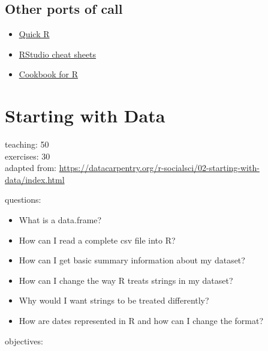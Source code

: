 \documentclass[]{book}
\providecommand{\tightlist}{%
  \setlength{\itemsep}{0pt}\setlength{\parskip}{0pt}}
\begin{document}
\section{Other ports of call}\label{other-ports-of-call}

\begin{itemize}
\tightlist
\item
  \href{http://www.statmethods.net/}{Quick R}
\item
  \href{http://www.rstudio.com/resources/cheatsheets/}{RStudio cheat
  sheets}
\item
  \href{http://www.cookbook-r.com/}{Cookbook for R}
\end{itemize}

\chapter{Starting with Data}\label{dataframes}

teaching: 50\\
exercises: 30\\
adapted from:
\url{https://datacarpentry.org/r-socialsci/02-starting-with-data/index.html}

questions:

\begin{itemize}
\tightlist
\item
  What is a data.frame?\\
\item
  How can I read a complete csv file into R?\\
\item
  How can I get basic summary information about my dataset?\\
\item
  How can I change the way R treats strings in my dataset?\\
\item
  Why would I want strings to be treated differently?\\
\item
  How are dates represented in R and how can I change the format?
\end{itemize}

objectives:
\end{document}
